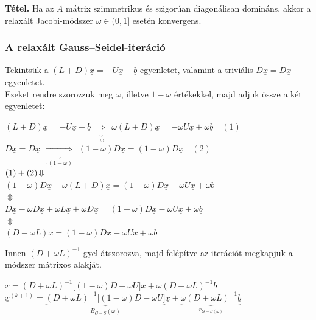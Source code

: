 \documentclass[tikz,12pt,margin=0px]{article}
\newcommand{\mybox}{%
    \collectbox{%
        \setlength{\fboxsep}{4pt}%
        \fbox{\BOXCONTENT}%
    }%
}
\begin{document}
	\noindent \textbf{Tétel.} Ha az $A$ mátrix szimmetrikus és szigorúan diagonálisan domináns, akkor a relaxált Jacobi-módszer $\omega \in (0,1]$ esetén konvergens.\\
	
	\subsubsection*{A relaxált Gauss–Seidel-iteráció}

    \noindent Tekintsük a $(L+D)\underline{x} = -U\underline{x} + \underline{b}$ egyenletet, valamint a triviális $D\underline{x} =
	D\underline{x}$ egyenletet.\\
    Ezeket rendre szorozzuk meg $\omega$, illetve $1 - \omega$ értékekkel, majd adjuk össze a két
	egyenletet:
	
    \begin{center}
        \small
      $(L+D)\underline{x} = -U\underline{x} + \underline{b}\ \ \underbrace{\Rightarrow}_{\cdot \omega} \ \ \omega (L+D)\underline{x} = -\omega U\underline{x} + \omega \underline{b} \quad (1)$\\
      $D\underline{x} = D\underline{x}\ \ \underbrace{\Rightarrow}_{\cdot (1 - \omega)}\ \ (1 -\omega) D\underline{x} = (1 -\omega) D\underline{x} \quad (2)$\\
      $(1)+(2) \left\Downarrow \right.$\\
      $(1 -\omega) D\underline{x} + \omega (L+D)\underline{x} = (1 -\omega) D\underline{x} -\omega U\underline{x} + \omega b$\\
      $\Updownarrow$\\
      $D\underline{x} -\omega D\underline{x} + \omega L\underline{x} + \omega D\underline{x} = (1 -\omega) D\underline{x} -\omega U\underline{x} + \omega \underline{b}$\\
      $\Updownarrow$\\
      $(D - \omega L)\underline{x} = (1 -\omega) D\underline{x} -\omega U\underline{x} + \omega \underline{b}$\\
    \end{center}

    \noindent Innen $(D +\omega L)^{-1}$-gyel átszorozva, majd felépítve az iterációt megkapjuk a módszer mátrixos alakját.

    \begin{center}
      {\small $\underline{x} = (D +\omega L)^{-1} \Big[(1 -\omega)D -\omega U\Big]\underline{x} + \omega (D +\omega L)^{-1} \underline{b}$}\\
      \mybox{$\underline{x}^{(k+1)} = \underbrace{(D +\omega L)^{-1} \Big[(1 -\omega)D -\omega U\Big]}_{B_{G-S}(\omega)}\underline{x} + \underbrace{\omega (D +\omega L)^{-1} \underline{b}}_{r_{G-S(\omega)}}$}\\
    \end{center}
\end{document}
